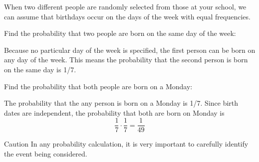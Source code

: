 \documentclass{beamer}
\begin{document}
\begin{frame}
\begin{example}
When two different people are randomly selected from those at your school, we can assume that birthdays occur on the days of the week with equal frequencies.

\vspace{2mm}
Find the probability that two people are born on the same day of the week:\pause 

\vspace{1mm}
Because no particular day of the week is specified, the first person can be born on any day of the week. This means the probability that the second person is born on the same day is 1/7.\pause

\vspace{2mm}
Find the probability that both people are born on a Monday:\pause

\vspace{1mm}
The probability that the any person is born on a Monday is 1/7. Since birth dates are independent, the probability that both are born on Monday is 
\vspace{-2mm}
\begin{equation*}
\dfrac{1}{7}\cdot\dfrac{1}{7}=\dfrac{1}{49}
\end{equation*}
\end{example}\pause

\begin{block}{Caution}
In any probability calculation, it is very important to carefully identify the event being considered.
\end{block}
\end{frame}
\end{document}
